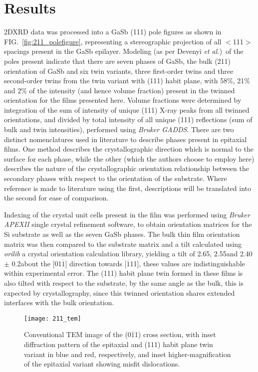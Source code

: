 \section{Results}
2DXRD data was processed into a GaSb (111) pole figures as shown in FIG.~\ref{fig:211_polefigure}, representing a stereographic projection of all $<$111$>$ spacings present in the GaSb epilayer. Modeling (as per Devenyi \textit{et al.}\cite{Devenyi2011})\ of the poles present indicate that there are seven phases of GaSb, the bulk (211) orientation of GaSb and six twin variants, three first-order twins and three second-order twins from the twin variant with (111) habit plane, with 58\%, 21\% and 2\% of the intensity (and hence volume fraction) present in the twinned orientation for the films presented here. Volume fractions were determined by integration of the sum of intensity of unique (111) X-ray peaks from all twinned orientations, and divided by total intensity of all unique (111) reflections (sum of bulk and twin intensities), performed using \textit{Bruker GADDS}. There are two distinct nomenclatures used in literature to describe phases present in epitaxial films.\cite{Kim2010a,Lange1991,Johnson2011,DeLyon1995} One method describes the crystallographic direction which is normal to the surface for each phase, while the other (which the authors choose to employ here) describes the nature of the crystallographic orientation relationship between the secondary phases with respect to the orientation of the substrate. Where reference is made to literature using the first, descriptions will be translated into the second for ease of comparison.

Indexing of the crystal unit cells present in the film was performed using \textit{Bruker APEXII} single crystal refinement software, to obtain orientation matrices for the Si substrate as well as the seven GaSb phases. The bulk thin film orientation matrix was then compared to the substrate matrix and a tilt calculated using \textit{orilib} a crystal orientation calculation library, yielding a tilt of 2.65\degree, 2.55\degree and 2.40\degree $\pm$ 0.2\degree about the [01$\overline{1}$] direction towards [$\overline{1}$11], these values are indistinguishable within experimental error. The (111) habit plane twin formed in these films is also tilted with respect to the substrate, by the same angle as the bulk, this is expected by crystallography, since this twinned orientation shares extended interfaces with the bulk orientation.
\begin{figure}
\texttt{[image: 211\_tem]}
\caption{\label{fig:211_tem}Conventional TEM image of the (0$\overline{1}$1) cross section, with inset diffraction pattern of the epitaxial and (111) habit plane twin variant in blue and red, respectively, and inset higher-magnification of the epitaxial variant showing misfit dislocations.}
\end{figure}

